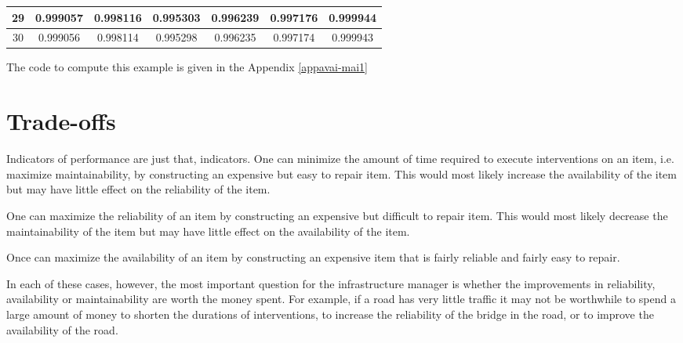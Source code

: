 \begin{table}[h]
\begin{tabular}{|l|l|l|l|l|l|l|}
\hline
\multicolumn{1}{|c|}{29} & \multicolumn{1}{c|}{0.999057} & \multicolumn{1}{c|}{0.998116} & \multicolumn{1}{c|}{0.995303} & \multicolumn{1}{c|}{0.996239} & \multicolumn{1}{c|}{0.997176} & \multicolumn{1}{c|}{0.999944} \\ 
\hline
\multicolumn{1}{|c|}{30} & \multicolumn{1}{c|}{0.999056} & \multicolumn{1}{c|}{0.998114} & \multicolumn{1}{c|}{0.995298} & \multicolumn{1}{c|}{0.996235} & \multicolumn{1}{c|}{0.997174} & \multicolumn{1}{c|}{0.999943} \\ 
\hline
\end{tabular}
\label{tblavaimain:2}
\end{table}

The code to compute this example is given in the Appendix \ref{appavai-mai1}
\section{Trade-offs}
Indicators of performance are just that, indicators. One can minimize the amount
of time required to execute interventions on an item, i.e. maximize
maintainability, by constructing an expensive but easy to repair item. This would
most likely increase the availability of the item but may have little effect on
the reliability of the item.

One can maximize the reliability of an item by constructing an expensive but
difficult to repair item. This would most likely decrease the maintainability of
the item but may have little effect on the availability of the item.

Once can maximize the availability of an item by constructing an expensive item
that is fairly reliable and fairly easy to repair.

In each of these cases, however, the most important question for the
infrastructure manager is whether the improvements in reliability, availability
or maintainability are worth the money spent. For example, if a road has very
little traffic it may not be worthwhile to spend a large amount of money to
shorten the durations of interventions, to increase the reliability of the bridge
in the road, or to improve the availability of the road.
